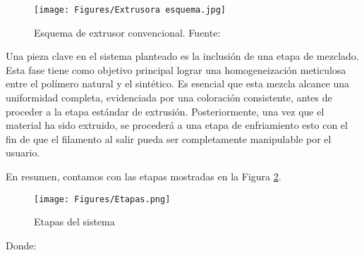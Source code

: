 \documentclass[14pt,oneside]{extarticle} %
\begin{document}
\begin{figure}[H]
    \centering
    \texttt{[image: Figures/Extrusora esquema.jpg]}
    \caption{Esquema de extrusor convencional. Fuente:\cite{esquemaExtrusora}}
    \label{Esquema1}
\end{figure}

Una pieza clave en el sistema planteado es la inclusión de una etapa de mezclado. Esta fase tiene como objetivo principal lograr una homogeneización meticulosa entre el polímero natural y el sintético. Es esencial que esta mezcla alcance una uniformidad completa, evidenciada por una coloración consistente, antes de proceder a la etapa estándar de extrusión. Posteriormente, una vez que el material ha sido extruido, se procederá a una etapa de enfriamiento esto con el fin de que el filamento al salir pueda ser completamente manipulable por el usuario.

En resumen, contamos con las etapas mostradas en la Figura \ref{Etapas}.

\begin{figure}[H]
    \centering
    \texttt{[image: Figures/Etapas.png]}
    \caption{Etapas del sistema}
    \label{Etapas}
\end{figure}

Donde:
\end{document}
